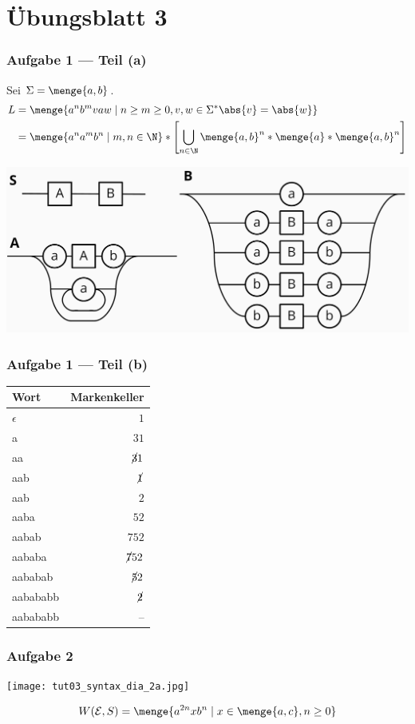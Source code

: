 \documentclass{beamer}
\begin{document}
\section{Übungsblatt 3}

\begin{frame} \frametitle{Aufgabe 1 --- Teil (a)}
	Sei $\Sigma = \menge{a,b}$.
	\begin{align*}
		L &= \menge{a^n b^m v a w \mid n \ge m \ge 0, v,w \in \Sigma^\ast \mit \abs{v} = \abs{w}} \\
		&= \menge{a^n a^m b^n \mid m,n \in \N} * \left[\bigcup_{n \in \N} \menge{a,b}^n * \menge{a} * \menge{a,b}^n \right]
	\end{align*}
	
	\begin{center}
		\includegraphics[width=\textwidth]{tut03_syntax_dia_1a.jpg}
	\end{center}
\end{frame}

\begin{frame} \frametitle{Aufgabe 1 --- Teil (b)}
	\centering
	\begin{tabular}{l|r}
		Wort & Markenkeller \\ \hline
		$\epsilon$ & $1$ \\
		a & $31$ \\
		aa & $\cancel{3}1$ \\
		aab & $\cancel{1}$ \\
		aab & $2$ \\
		aaba & $52$ \\
		aabab & $752$ \\
		aababa & $\cancel{7}52$ \\
		aababab & $\cancel{5}2$ \\
		aabababb & $\cancel{2}$ \\
		aabababb & --
	\end{tabular}
\end{frame}

\begin{frame} \frametitle{Aufgabe 2}
	\begin{center}
		\texttt{[image: tut03\_syntax\_dia\_2a.jpg]}
	\end{center}

	\begin{equation*}
		W(\mathcal{E},S) = \menge{a^{2n} x b^n \mid x \in \menge{a,c}, n \ge 0}
	\end{equation*}
\end{frame}
\end{document}
